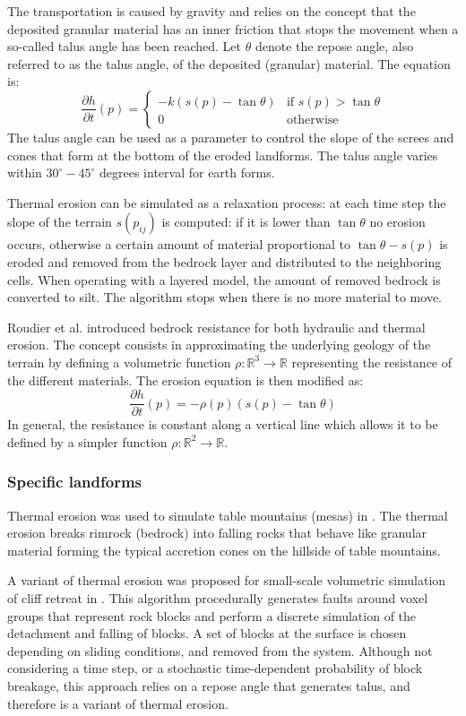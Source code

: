 \documentclass{article}
\begin{document}
The transportation is caused by gravity and relies on the concept that the deposited granular material has an inner friction that stops the movement when a so-called talus angle has been reached. Let $\theta$ denote the repose angle, also referred to as the talus angle, of the deposited (granular) material. The equation is:
\[
\frac{\partial h}{\partial t}(p) =
\begin{cases}
-k(s(p) - \tan\theta) & \text{if } s(p) > \tan\theta \\
0 & \text{otherwise}
\end{cases}
\]
The talus angle can be used as a parameter to control the slope of the screes and cones that form at the bottom of the eroded landforms. The talus angle varies within $30^\circ - 45^\circ$ degrees interval for earth forms.

Thermal erosion can be simulated as a relaxation process: at each time step the slope of the terrain $s(p_{ij})$ is computed: if it is lower than $\tan\theta$ no erosion occurs, otherwise a certain amount of material proportional to $\tan\theta - s(p)$ is eroded and removed from the bedrock layer and distributed to the neighboring cells. When operating with a layered model, the amount of removed bedrock is converted to silt. The algorithm stops when there is no more material to move.

Roudier et al. \cite{RPP93} introduced bedrock resistance for both hydraulic and thermal erosion. The concept consists in approximating the underlying geology of the terrain by defining a volumetric function $\rho : \mathbb{R}^3 \to \mathbb{R}$ representing the resistance of the different materials. The erosion equation is then modified as:
\[
\frac{\partial h}{\partial t}(p) = -\rho(p)(s(p) - \tan\theta)
\]
In general, the resistance is constant along a vertical line which allows it to be defined by a simpler function $\rho : \mathbb{R}^2 \to \mathbb{R}$.

\subsubsection{Specific landforms}

Thermal erosion was used to simulate table mountains (mesas) in \cite{BA05c}. The thermal erosion breaks rimrock (bedrock) into falling rocks that behave like granular material forming the typical accretion cones on the hillside of table mountains.

A variant of thermal erosion was proposed for small-scale volumetric simulation of cliff retreat in \cite{IFMC03}. This algorithm procedurally generates faults around voxel groups that represent rock blocks and perform a discrete simulation of the detachment and falling of blocks. A set of blocks at the surface is chosen depending on sliding conditions, and removed from the system. Although not considering a time step, or a stochastic time-dependent probability of block breakage, this approach relies on a repose angle that generates talus, and therefore is a variant of thermal erosion.
\end{document}
